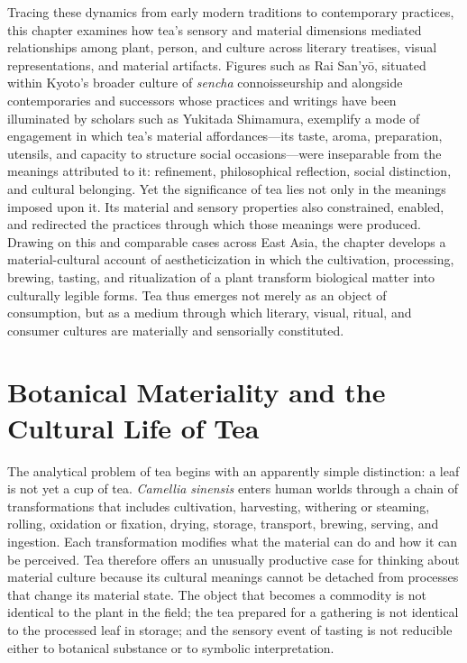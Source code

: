 \documentclass[numbers]{IntechOpen-Book}
\begin{document}
Tracing these dynamics from early modern traditions to contemporary practices, this chapter examines how tea's sensory and material dimensions mediated relationships among plant, person, and culture across literary treatises, visual representations, and material artifacts. Figures such as Rai San'yō, situated within Kyoto's broader culture of \textit{sencha} connoisseurship and alongside contemporaries and successors whose practices and writings have been illuminated by scholars such as Yukitada Shimamura, exemplify a mode of engagement in which tea's material affordances---its taste, aroma, preparation, utensils, and capacity to structure social occasions---were inseparable from the meanings attributed to it: refinement, philosophical reflection, social distinction, and cultural belonging. Yet the significance of tea lies not only in the meanings imposed upon it. Its material and sensory properties also constrained, enabled, and redirected the practices through which those meanings were produced. Drawing on this and comparable cases across East Asia, the chapter develops a material-cultural account of aestheticization in which the cultivation, processing, brewing, tasting, and ritualization of a plant transform biological matter into culturally legible forms. Tea thus emerges not merely as an object of consumption, but as a medium through which literary, visual, ritual, and consumer cultures are materially and sensorially constituted.

\section{Botanical Materiality and the Cultural Life of Tea}

The analytical problem of tea begins with an apparently simple distinction: a leaf is not yet a cup of tea. \textit{Camellia sinensis} enters human worlds through a chain of transformations that includes cultivation, harvesting, withering or steaming, rolling, oxidation or fixation, drying, storage, transport, brewing, serving, and ingestion. Each transformation modifies what the material can do and how it can be perceived. Tea therefore offers an unusually productive case for thinking about material culture because its cultural meanings cannot be detached from processes that change its material state. The object that becomes a commodity is not identical to the plant in the field; the tea prepared for a gathering is not identical to the processed leaf in storage; and the sensory event of tasting is not reducible either to botanical substance or to symbolic interpretation.
\end{document}
